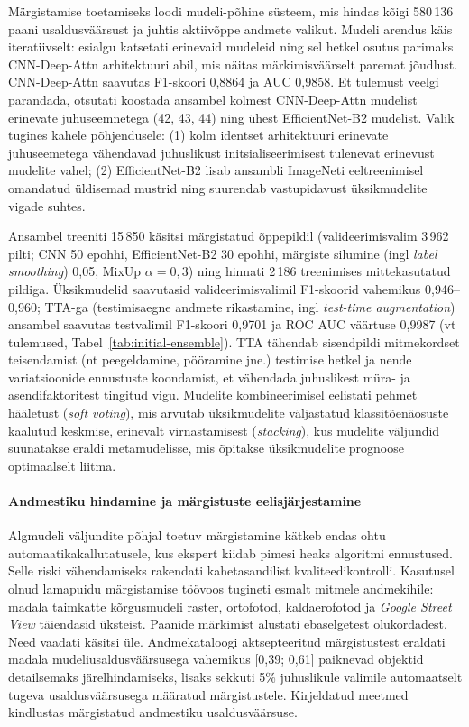     Märgistamise toetamiseks loodi mudeli-põhine süsteem, mis hindas kõigi 580\,136 paani usaldusväärsust ja juhtis aktiivõppe andmete valikut. Mudeli arendus käis iteratiivselt: esialgu katsetati erinevaid mudeleid ning sel hetkel osutus parimaks CNN-Deep-Attn arhitektuuri abil, mis näitas märkimisväärselt paremat jõudlust. CNN-Deep-Attn saavutas F1-skoori 0,8864 ja AUC 0,9858. Et tulemust veelgi parandada, otsutati koostada  ansambel kolmest CNN-Deep-Attn mudelist erinevate juhuseemnetega (42, 43, 44) ning ühest EfficientNet-B2 mudelist. Valik tugines kahele põhjendusele: (1) kolm identset arhitektuuri erinevate juhuseemetega vähendavad juhuslikust initsialiseerimisest tulenevat erinevust mudelite vahel; (2) EfficientNet-B2 lisab ansambli ImageNeti eeltreenimisel omandatud üldisemad mustrid ning suurendab vastupidavust üksikmudelite vigade suhtes.

    Ansambel treeniti 15\,850 käsitsi märgistatud õppepildil (valideerimisvalim 3\,962 pilti; CNN 50 epohhi, EfficientNet-B2 30 epohhi, märgiste silumine (ingl \textit{label smoothing}) 0,05, MixUp $\alpha=0{,}3$) ning hinnati 2\,186 treenimises mittekasutatud pildiga. Üksikmudelid saavutasid valideerimisvalimil F1-skoorid vahemikus 0,946--0,960; TTA-ga (testimisaegne andmete rikastamine, ingl \textit{test-time augmentation}) \parencite{moshkov_test-time_2020} ansambel saavutas testvalimil F1-skoori 0,9701 ja ROC AUC väärtuse 0,9987 (vt tulemused, Tabel~\ref{tab:initial-ensemble}). TTA tähendab sisendpildi mitmekordset teisendamist (nt peegeldamine, pööramine jne.) testimise hetkel ja nende variatsioonide ennustuste koondamist, et vähendada juhuslikest müra- ja asendifaktoritest tingitud vigu. Mudelite kombineerimisel eelistati pehmet hääletust (\textit{soft voting}), mis arvutab üksikmudelite väljastatud klassitõenäosuste kaalutud keskmise, erinevalt virnastamisest (\textit{stacking}), kus mudelite väljundid suunatakse eraldi metamudelisse, mis õpitakse üksikmudelite prognoose optimaalselt liitma.

    \paragraph{Andmestiku hindamine ja märgistuste eelisjärjestamine}
    Algmudeli väljundite põhjal toetuv märgistamine kätkeb endas ohtu automaatikakallutatusele, kus ekspert kiidab pimesi heaks algoritmi ennustused. Selle riski vähendamiseks rakendati kahetasandilist kvaliteedikontrolli. Kasutusel olnud lamapuidu märgistamise töövoos tugineti esmalt mitmele andmekihile: madala taimkatte kõrgusmudeli raster, ortofotod, kaldaerofotod ja \textit{Google Street View} täiendasid üksteist. Paanide märkimist alustati ebaselgetest olukordadest. Need vaadati käsitsi üle. Andmekataloogi aktsepteeritud märgistustest eraldati madala mudeliusaldusväärsusega vahemikus [0,39; 0,61] paiknevad objektid detailsemaks järelhindamiseks, lisaks sekkuti 5\% juhuslikule valimile automaatselt tugeva usaldusväärsusega määratud märgistustele. Kirjeldatud meetmed kindlustas märgistatud andmestiku usaldusväärsuse.

